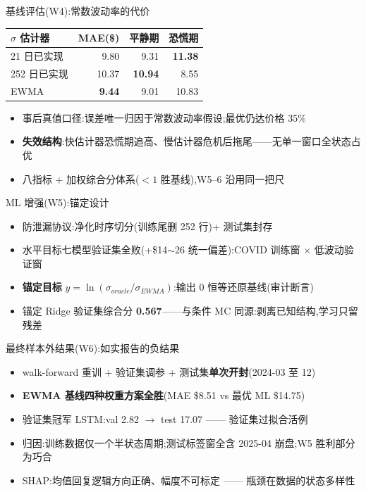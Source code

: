 \documentclass[aspectratio=169]{beamer}
\begin{document}
\begin{frame}{基线评估(W4):常数波动率的代价}
\centering
\begin{tabular}{lrrr}
\toprule
$\sigma$ 估计器 & MAE(\$) & 平静期 & 恐慌期 \\
\midrule
21 日已实现 & 9.80 & 9.31 & \textbf{11.38} \\
252 日已实现 & 10.37 & \textbf{10.94} & 8.55 \\
EWMA & \textbf{9.44} & 9.01 & 10.83 \\
\bottomrule
\end{tabular}
\begin{itemize}
  \item 事后真值口径:误差唯一归因于常数波动率假设;最优仍达价格 35\%
  \item \textbf{失效结构}:快估计器恐慌期追高、慢估计器危机后拖尾——无单一窗口全状态占优
  \item 八指标 + 加权综合分体系($<1$ 胜基线),W5--6 沿用同一把尺
\end{itemize}
\end{frame}

\begin{frame}{ML 增强(W5):锚定设计}
\begin{itemize}
  \item 防泄漏协议:净化时序切分(训练尾删 252 行)+ 测试集封存
  \item 水平目标七模型验证集全败(+\$14$\sim$26 统一偏差):COVID 训练窗 $\times$ 低波动验证窗
  \item \textbf{锚定目标} $y=\ln(\sigma_{oracle}/\sigma_{EWMA})$:输出 0 恒等还原基线(审计断言)
  \item 锚定 Ridge 验证集综合分 \textbf{0.567}——与条件 MC 同源:剥离已知结构,学习只留残差
\end{itemize}
\end{frame}

\begin{frame}{最终样本外结果(W6):如实报告的负结果}
\begin{itemize}
  \item walk-forward 重训 + 验证集调参 + 测试集\textbf{单次开封}(2024-03 至 12)
  \item \textbf{EWMA 基线四种权重方案全胜}(MAE \$8.51 vs 最优 ML \$14.75)
  \item 验证集冠军 LSTM:val 2.82 $\to$ test 17.07 —— 验证集过拟合活例
  \item 归因:训练数据仅一个半状态周期;测试标签窗全含 2025-04 崩盘;W5 胜利部分为巧合
  \item SHAP:均值回复逻辑方向正确、幅度不可标定 —— 瓶颈在数据的状态多样性
\end{itemize}
\end{frame}
\end{document}
